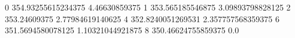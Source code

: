 0 354.93255615234375 4.46630859375
1 353.565185546875 3.09893798828125
2 353.24609375 2.77984619140625
4 352.8240051269531 2.357757568359375
6 351.5694580078125 1.10321044921875
8 350.46624755859375 0.0

